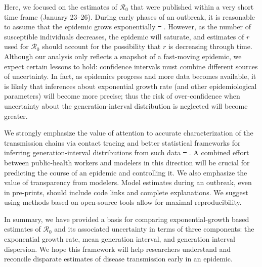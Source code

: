 \documentclass[12pt]{article}
\newcommand{\Ro}{\ensuremath{{\mathcal R}_{0}}\xspace}
\providecommand{\DIFaddtex}[1]{{\protect\color{blue}\uwave{#1}}} %
\providecommand{\DIFdeltex}[1]{{\protect\color{red}\sout{#1}}}                      %
\providecommand{\DIFaddbegin}{} %
\providecommand{\DIFaddend}{} %
\providecommand{\DIFdelbegin}{} %
\providecommand{\DIFdelend}{} %
\providecommand{\DIFadd}[1]{\texorpdfstring{\DIFaddtex{#1}}{#1}} %
\providecommand{\DIFdel}[1]{\texorpdfstring{\DIFdeltex{#1}}{}} %
\newcommand{\DIFscaledelfig}{0.5}
\newlength{\DIFdelgraphicswidth} %
\newlength{\DIFdelgraphicsheight} %
\newcommand{\DIFaddincludegraphics}[2][]{{\color{blue}\fbox{\DIFOincludegraphics[#1]{#2}}}} %
\newcommand{\DIFdelincludegraphics}[2][]{%
\sbox{\DIFdelgraphicsbox}{\DIFOincludegraphics[#1]{#2}}%
\settoboxwidth{\DIFdelgraphicswidth}{\DIFdelgraphicsbox} %
\settoboxtotalheight{\DIFdelgraphicsheight}{\DIFdelgraphicsbox} %
\scalebox{\DIFscaledelfig}{%
\parbox[b]{\DIFdelgraphicswidth}{\usebox{\DIFdelgraphicsbox}\\[-\baselineskip] \rule{\DIFdelgraphicswidth}{0em}}\llap{\resizebox{\DIFdelgraphicswidth}{\DIFdelgraphicsheight}{%
\setlength{\unitlength}{\DIFdelgraphicswidth}%
\begin{picture}(1,1)%
\thicklines\linethickness{2pt} %
{\color[rgb]{1,0,0}\put(0,0){\framebox(1,1){}}}%
{\color[rgb]{1,0,0}\put(0,0){\line( 1,1){1}}}%
{\color[rgb]{1,0,0}\put(0,1){\line(1,-1){1}}}%
\end{picture}%
}\hspace*{3pt}}} %
} %
\DeclareRobustCommand{\DIFaddbegin}{\DIFOaddbegin \let\includegraphics\DIFaddincludegraphics} %
\DeclareRobustCommand{\DIFaddend}{\DIFOaddend \let\includegraphics\DIFOincludegraphics} %
\DeclareRobustCommand{\DIFdelbegin}{\DIFOdelbegin \let\includegraphics\DIFdelincludegraphics} %
\DeclareRobustCommand{\DIFdelend}{\DIFOaddend \let\includegraphics\DIFOincludegraphics} %
\begin{document}
Here, we focused on the estimates of \Ro that were published within a very short time frame (January 23--26).
During early phases of an outbreak, it is reasonable to assume that the epidemic grows exponentially \DIFdelbegin \DIFdel{\mbox{%
\cite{anderson1991infectious}}\hspace{0pt}%
}\DIFdelend \DIFaddbegin \DIFadd{\mbox{%
\citep{anderson1991infectious}}\hspace{0pt}%
}\DIFaddend . However, as the number of susceptible individuals decreases, the epidemic will saturate, and estimates of $r$ used for \Ro should account for the possibility that $r$ is decreasing through time.
Although our analysis only reflects a snapshot of a fast-moving epidemic, we expect certain lessons to hold: confidence intervals must combine different sources of uncertainty. 
In fact, as epidemics progress and more data becomes available, it is likely that inferences about exponential growth rate (and other epidemiological parameters) will become more precise; thus the risk of over-confidence when uncertainty about the generation-interval distribution is neglected will become greater.

We strongly emphasize the value of attention to accurate characterization of the transmission chains via contact tracing and better statistical frameworks for inferring generation-interval distributions from such data \DIFdelbegin \DIFdel{\mbox{%
\cite{britton2019estimation}}\hspace{0pt}%
}\DIFdelend \DIFaddbegin \DIFadd{\mbox{%
\citep{britton2019estimation}}\hspace{0pt}%
}\DIFaddend .
A combined effort between public-health workers and modelers in this direction will be crucial for predicting the course of an epidemic and controlling it.
We also emphasize the value of transparency from modelers.
Model estimates during an outbreak, even in pre-prints, should include code links and complete explanations.
We suggest using methods based on open-source tools allow for maximal reproducibility.

In summary, we have provided a basis for comparing exponential-growth based estimates of \Ro and its associated uncertainty in terms of three components: the exponential growth rate, mean generation interval, and generation interval dispersion. 
We hope this framework will help researchers understand and reconcile disparate estimates of disease transmission early in an epidemic.
\end{document}
